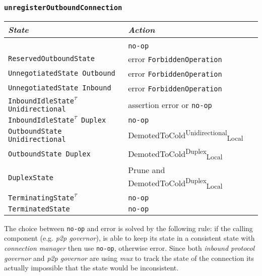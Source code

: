 \documentclass{article}
\def\InitialState{\textbullet}
\def\ReservedOutboundState{\texttt{ReservedOutboundState}}
\def\UnnegotiatedStateOut{\texttt{UnnegotiatedState Outbound}}
\def\UnnegotiatedStateIn{\texttt{UnnegotiatedState Inbound}}
\def\OutboundStateUni{\texttt{OutboundState\phantom{\textsuperscript{$\tau$}} Unidirectional}}
\def\OutboundStateDup{\texttt{OutboundState\phantom{\textsuperscript{$\tau$}} Duplex}}
\def\DuplexState{\texttt{DuplexState}}
\def\InboundIdleStateUni{\texttt{InboundIdleState\textsuperscript{$\tau$} Unidirectional}}
\def\InboundIdleStateDup{\texttt{InboundIdleState\textsuperscript{$\tau$} Duplex}}
\def\TerminatingState{\texttt{TerminatingState\textsuperscript{$\tau$}}}
\def\TerminatedState{\texttt{TerminatedState}}
\def\DemotedToColdDupLoc{\textsf{DemotedToCold}\textsuperscript{\textsf{Duplex}}\textsubscript{\textsf{Local}}}
\def\DemotedToColdUniLoc{\textsf{DemotedToCold}\textsuperscript{\textsf{Unidirectional}}\textsubscript{\textsf{Local}}}
\def\Prune{\textsf{Prune}}
\def\ptopgov{\textit{p2p governor}}
\def\mux{\textit{mux}}
\def\inbgov{\textit{inbound protocol governor}}
\def\connmngr{\textit{connection manager}}
\begin{document}
\subsubsection{\texttt{unregisterOutboundConnection}}
\begin{center}
  \begin{tabular}[h]{ll}
    \textit{State}           & \textit{Action} \\\hline\\[2pt]
    \InitialState{}          & \texttt{no-op} \\[8pt]
    \ReservedOutboundState{} & error \texttt{ForbiddenOperation} \\[8pt]
    \UnnegotiatedStateOut{}  & error \texttt{ForbiddenOperation} \\[8pt]
    \UnnegotiatedStateIn{}   & error \texttt{ForbiddenOperation} \\[8pt]
    \InboundIdleStateUni{}   & assertion error or \texttt{no-op} \\[8pt]
    \InboundIdleStateDup{}   & \texttt{no-op} \\[8pt]
    \OutboundStateUni{}      & \DemotedToColdUniLoc{} \\[8pt]
    \OutboundStateDup{}      & \DemotedToColdDupLoc{} \\[8pt]
    \DuplexState{}           & \Prune{} and \DemotedToColdDupLoc{} \\[8pt]
    \TerminatingState{}      & \texttt{no-op} \\[8pt]
    \TerminatedState{}       & \texttt{no-op} \\[8pt]
  \end{tabular}
\end{center}
The choice between \texttt{no-op} and error is solved by the following rule: if
the calling component (e.g. \ptopgov{}), is able to keep its state in
a consistent state with \connmngr{} then use \texttt{no-op}, otherwise
error.  Since both \inbgov{} and \ptopgov{} are using \mux{} to track the state
of the connection its actually impossible that the state would be inconsistent.
\end{document}
